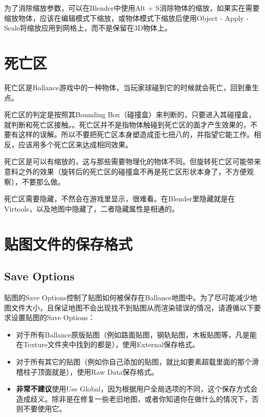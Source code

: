 为了消除缩放参数，可以在Blender中使用Alt + S消除物体的缩放，如果实在需要缩放物体，应该在编辑模式下缩放，或物体模式下缩放后使用Object - Apply - Scale将缩放应用到网格上，而不是保留在3D物体上。

\section{死亡区}

死亡区是Ballance游戏中的一种物体，当玩家球碰到它的时候就会死亡，回到重生点。

死亡区的判定是按照其Bounding Box（碰撞盒）来判断的，只要进入其碰撞盒，就判断和死亡区接触。。死亡区并不是指物体触碰到死亡区的面才产生效果的，不要有这样的误解。所以不要把死亡区本身塑造成歪七扭八的，并指望它能工作。相反，应该用多个死亡区来达成相同效果。

死亡区是可以有缩放的，这与那些需要物理化的物体不同。但旋转死亡区可能带来意料之外的效果（旋转后的死亡区的碰撞盒不再是死亡区形状本身了，不方便观察），不要那么做。

死亡区需要隐藏，不然会在游戏里显示，很难看。在Blender里隐藏就是在Virtools，以及地图中隐藏了，二者隐藏属性是相通的。

\section{贴图文件的保存格式}

\subsection{Save Options}

贴图的Save Options控制了贴图如何被保存在Ballance地图中。为了尽可能减少地图文件大小，且保证地图不会出现找不到贴图从而渲染错误的情况，请遵循以下要求设置贴图的Save Options：

\begin{itemize}

\item 对于所有Ballance原版贴图（例如路面贴图，钢轨贴图，木板贴图等，凡是能在Texture文件夹中找到的都是），使用External保存格式。

\item 对于所有其它的贴图（例如你自己添加的贴图，就比如要素超载里面的那个滑稽柱子顶面就是），使用Raw Data保存格式。

\item \textbf{非常不建议}使用Use Global，因为根据用户全局选项的不同，这个保存方式会造成歧义。除非是在修复一些老旧地图，或者你知道你在做什么的情况下，否则不要使用它。

\end{itemize}

